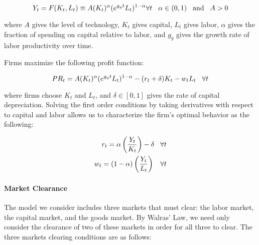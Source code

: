 \documentclass[10pt]{article}
\numberwithin{equation}{subsection}
\begin{document}
\begin{appendices}
\begin{equation}
   Y_t = F(K_t, L_t) \equiv A(K_t)^\alpha(e^{g_yt}L_t)^{1-\alpha} \forall t \hspace{3mm} \alpha \in (0, 1) \hspace{3mm} \text{and} \hspace{3mm} A>0
\end{equation}

\par where \(A\) gives the level of technology, \(K_t\) gives capital, \(L_t\) gives labor, \(\alpha\) gives the fraction of spending on capital relative to labor, and \(g_y\) gives the growth rate of labor productivity over time.

\par Firms maximize the following profit function:

\begin{equation}
   PR_t = A(K_t)^\alpha(e^{g_yt}L_t)^{1-\alpha} - (r_t + \delta)K_t - w_tL_t \hspace{3mm} \forall t \label{eq:firm_profit}
\end{equation}

\par where firms choose \(K_t\) and \(L_t\), and \(\delta \in [0, 1]\) gives the rate of capital depreciation. Solving the first order conditions by taking derivatives with respect to capital and labor allows us to characterize the firm's optimal behavior as the following:

\begin{align}
   r_t = \alpha\left(\frac{Y_t}{K_t}\right) - \delta \hspace{3mm} \forall t \\
   w_t = (1-\alpha)\left(\frac{Y_t}{L_t}\right)\hspace{3mm} \forall t
\end{align}


\paragraph{Market Clearance}

\par The model we consider includes three markets that must clear: the labor market, the capital market, and the goods market. By Walras' Law, we need only consider the clearance of two of these markets in order for all three to clear. The three markets clearing conditions are as follows:


\end{appendices}
\end{document}
